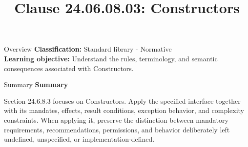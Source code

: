 \documentclass[10pt,letterpaper]{article}
\title{Clause 24.06.08.03: Constructors}
\author{}
\date{}
\begin{document}
\maketitle
\begin{CornellOverviewBox}{Overview}
\textbf{Classification:} Standard library - Normative\\[2pt]
\textbf{Learning objective:} Understand the rules, terminology, and semantic consequences associated with Constructors.
\end{CornellOverviewBox}\begin{CornellSummaryBox}{Summary}
{\sffamily\bfseries\color{Accent} Summary}\par\vspace{3pt}Section 24.6.8.3 focuses on Constructors. Apply the specified interface together with its mandates, effects, result conditions, exception behavior, and complexity constraints. When applying it, preserve the distinction between mandatory requirements, recommendations, permissions, and behavior deliberately left undefined, unspecified, or implementation-defined.
\end{CornellSummaryBox}
\end{document}
